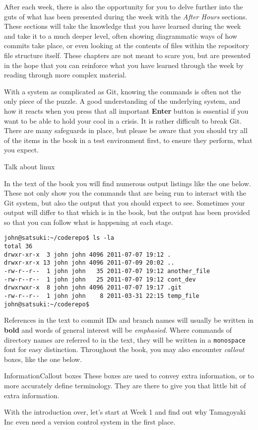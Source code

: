 After each week, there is also the opportunity for you to delve further into the guts of what has been presented during the week with the \emph{After Hours} sections.
These sections will take the knowledge that you have learned during the week and take it to a much deeper level, often showing diagrammatic ways of how commits take place, or even looking at the contents of files within the repository file structure itself.
These chapters are not meant to scare you, but are presented in the hope that you can reinforce what you have learned through the week by reading through more complex material.

With a system as complicated as Git, knowing the commands is often not the only piece of the puzzle.
A good understanding of the underlying system, and how it reacts when you press that all important \textbf{Enter} button is essential if you want to be able to hold your cool in a crisis.
It is rather difficult to break Git.
There are many safeguards in place, but please be aware that you should try all of the items in the book in a test environment first, to ensure they perform, what you expect.

Talk about linux

In the text of the book you will find numerous output listings like the one below.
These not only show you the commands that are being run to interact with the Git system, but also the output that you should expect to see.
Sometimes your output will differ to that which is in the book, but the output has been provided so that you can follow what is happening at each stage.

\begin{Verbatim}
john@satsuki:~/coderepo$ ls -la
total 36
drwxr-xr-x  3 john john 4096 2011-07-07 19:12 .
drwxr-xr-x 13 john john 4096 2011-07-09 20:02 ..
-rw-r--r--  1 john john   35 2011-07-07 19:12 another_file
-rw-r--r--  1 john john   25 2011-07-07 19:12 cont_dev
drwxrwxr-x  8 john john 4096 2011-07-07 19:17 .git
-rw-r--r--  1 john john    8 2011-03-31 22:15 temp_file
john@satsuki:~/coderepo$
\end{Verbatim}

References in the text to commit IDs and branch names will usually be written in \textbf{bold} and words of general interest will be \emph{emphasied}.
Where commands of directory names are referred to in the text, they will be written in a \texttt{monospace} font for easy distinction.
Throughout the book, you may also encounter \emph{callout} boxes, like the one below.

\begin{callout}{Information}{Callout boxes}
These boxes are used to convey extra information, or to more accurately define terminology.
They are there to give you that little bit of extra information.
\end{callout}

With the introduction over, let's start at Week 1 and find out why Tamagoyaki Inc even need a version control system in the first place.
